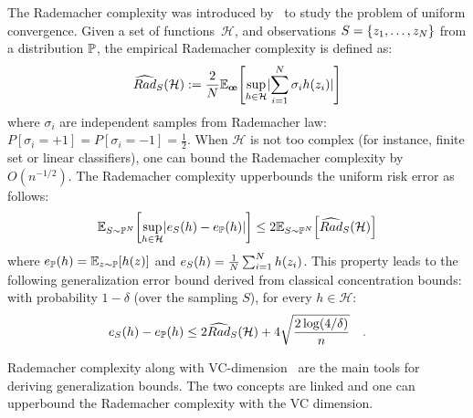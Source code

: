 The Rademacher complexity was introduced by~\cite{bartlett2002rademacher} to study the problem of uniform convergence. Given a set of functions~$\mathcal{H}$, and observations $S=\{z_1,\dots,z_N\}$ from a distribution $\mathbb{P}$, the empirical Rademacher complexity is defined as:
\begin{align*}
    \widehat{Rad}_S(\mathcal{H}):=\frac2\numsamples\mathbb{E}_{\mathbf{\sigma}}\left[\sup_{h\in\mathcal{H}}\lvert\sum_{i=1}^\numsamples\sigma_i h(z_i)\rvert\right]
\end{align*}
where $\sigma_i$ are independent samples from Rademacher law: $P[\sigma_i =+1] = P[\sigma_i =-1]=\frac12$. When $\mathcal{H}$ is not too complex (for instance, finite set or linear classifiers), one can bound the Rademacher complexity  by $O(n^{-1/2})$. The Rademacher complexity upperbounds the uniform risk error as follows:
\begin{align*}
    \mathbb{E}_{S\sim\PP^\numsamples}\left[\sup_{h\in\mathcal{H}}\lvert e_S(h)-e_\PP(h)\rvert\right]\leq 2\mathbb{E}_{S\sim\PP^\numsamples}\left[\widehat{Rad}_S(\mathcal{H})\right]
\end{align*}
where $e_\PP(h)=\mathbb{E}_{z\sim\PP}\left[h(z)\right]$ and $e_S(h)=\frac1{N} \sum_{i=1}^N h(z_i)$. This property leads to the following generalization error bound derived from classical concentration bounds: with probability $1-\delta$ (over the sampling $S$), for every $h\in \mathcal{H}$:
\begin{align*}
    e_S(h)-e_{\mathbb{P}}(h)\leq 2  \widehat{Rad}_S(\mathcal{H})+4\sqrt{\frac{2\log(4/\delta)}{n}}\quad.
\end{align*}


Rademacher complexity along with VC-dimension~\citep{vapnik1998} are the main tools for deriving generalization bounds. The two concepts are linked and one can upperbound the Rademacher complexity with the VC dimension.  



